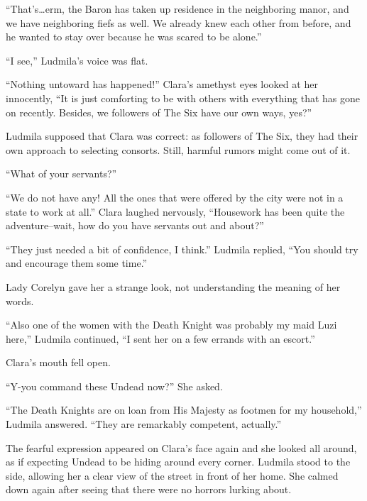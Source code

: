  

“That’s…erm, the Baron has taken up residence in the neighboring manor, and we have neighboring fiefs as well. We already knew each other from before, and he wanted to stay over because he was scared to be alone.”

 

“I see,” Ludmila’s voice was flat.

 

“Nothing untoward has happened!” Clara’s amethyst eyes looked at her innocently, “It is just comforting to be with others with everything that has gone on recently. Besides, we followers of The Six have our own ways, yes?”

 

Ludmila supposed that Clara was correct: as followers of The Six, they had their own approach to selecting consorts. Still, harmful rumors might come out of it.

 

“What of your servants?”

 

“We do not have any! All the ones that were offered by the city were not in a state to work at all.” Clara laughed nervously, “Housework has been quite the adventure–wait, how do you have servants out and about?”

 

“They just needed a bit of confidence, I think.” Ludmila replied, “You should try and encourage them some time.”

 

Lady Corelyn gave her a strange look, not understanding the meaning of her words.

 

“Also one of the women with the Death Knight was probably my maid Luzi here,” Ludmila continued, “I sent her on a few errands with an escort.”

 

Clara’s mouth fell open.

 

“Y-you command these Undead now?” She asked.

 

“The Death Knights are on loan from His Majesty as footmen for my household,” Ludmila answered. “They are remarkably competent, actually.”

 

The fearful expression appeared on Clara’s face again and she looked all around, as if expecting Undead to be hiding around every corner. Ludmila stood to the side, allowing her a clear view of the street in front of her home. She calmed down again after seeing that there were no horrors lurking about.

